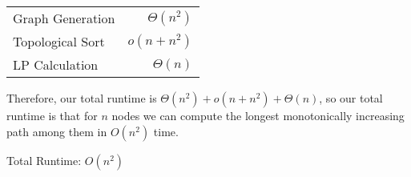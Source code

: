 \documentclass[11pt, letterpaper]{article}
\begin{document}
\begin{enumerate}
\begin{enumerate}
\end{enumerate}

\begin{center}
\begin{tabular}{l r}
Graph Generation & $\Theta(n^2)$ \\
Topological Sort & $o(n + n^2)$ \\
LP Calculation & $\Theta(n)$ \\
\end{tabular}
\end{center}

\quad Therefore, our total runtime is $\Theta(n^2) + o(n + n^2) + \Theta(n)$, so our total runtime is that for $n$ nodes we can compute the longest monotonically increasing path among them in $O(n^2)$ time.

\begin{center}
Total Runtime: $O(n^2)$
\end{center}

\end{enumerate}
\end{document}

